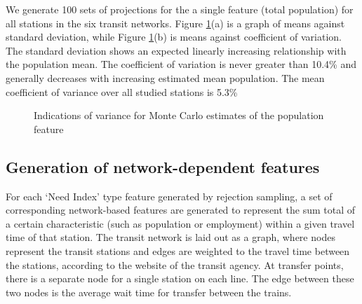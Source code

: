 \documentclass[11pt]{article}
\begin{document}
We generate 100 sets of projections for the a single feature (total population) for all stations in the six transit networks. Figure \ref{fig:mcvar}(a) is a graph of means against standard deviation, while Figure \ref{fig:mcvar}(b) is means against coefficient of variation. The standard deviation shows an expected  linearly increasing relationship with the population mean.  The coefficient of variation is never greater than 10.4\% and generally decreases with increasing estimated mean population. The mean coefficient of variance over all studied stations is 5.3\%

\begin{figure}[H]
\centering
{}
\caption{Indications of variance for Monte Carlo estimates of the population feature}\label{fig:mcvar}
\end{figure}

  

\subsection{Generation of network-dependent features}

For each `Need Index' type feature generated by rejection sampling, a set of corresponding network-based features are generated to represent the sum total of a certain characteristic (such as population or employment) within a given travel time of that station. The transit network is laid out as a graph, where nodes represent the transit stations and edges are weighted to the travel time between the stations, according to the website of the transit agency. At transfer points, there is a separate node for a single station on each line. The edge between these two nodes is the average wait time for transfer between the trains. 
\end{document}
